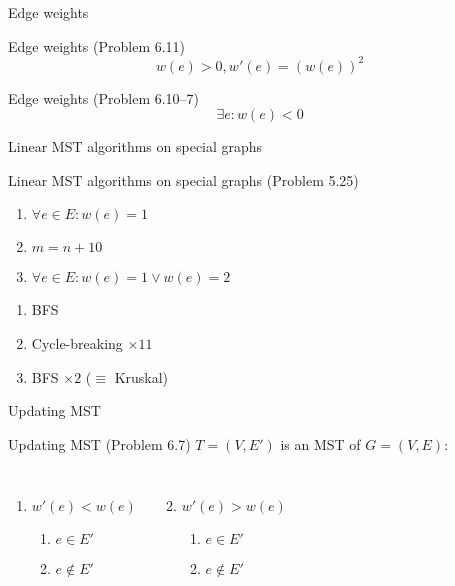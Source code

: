 \begin{frame}{Edge weights}
  \begin{exampleblock}{Edge weights (Problem 6.11)}
	\[
	  w(e) > 0, w'(e) = \left(w(e)\right)^2
	\]
  \end{exampleblock}

  \vspace{0.50cm}
  \begin{exampleblock}{Edge weights (Problem 6.10--7)}
	\[
	  \exists e: w(e) < 0
	\]
  \end{exampleblock}
\end{frame}
\begin{frame}{Linear MST algorithms on special graphs}
  \begin{exampleblock}{Linear MST algorithms on special graphs (Problem 5.25)}
	\begin{enumerate}
	  \item $\forall e \in E: w(e) = 1$
	  \item $m = n + 10$
	  \item $\forall e \in E: w(e) = 1 \lor w(e) = 2$
	\end{enumerate}
  \end{exampleblock}

  \begin{enumerate}
	\item BFS
	\item Cycle-breaking $\times 11$
	\item BFS $\times 2$ ($\equiv$ Kruskal)
  \end{enumerate}
\end{frame}
\begin{frame}{Updating MST}
  \begin{exampleblock}{Updating MST (Problem 6.7)}
	$T = (V, E')$ is an MST of $G = (V, E)$:
	\begin{columns}
		\begin{enumerate}
		  \item $w'(e) < w(e)$
			\begin{enumerate}
			  \item $e \in E'$
			  \item $e \notin E'$
			\end{enumerate}
		\end{enumerate}
		\begin{enumerate}
		  \setcounter{enumi}{1}
		  \item $w'(e) > w(e)$
			\begin{enumerate}
			  \item $e \in E'$
			  \item $e \notin E'$
			\end{enumerate}
		\end{enumerate}
	\end{columns}
  \end{exampleblock}

\end{frame}
